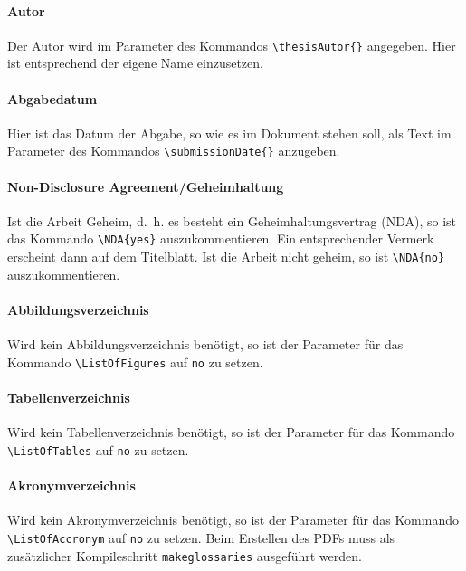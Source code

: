 \paragraph{Autor} Der Autor wird im Parameter des Kommandos \texttt{\textbackslash thesisAutor\{\}} angegeben. Hier ist entsprechend der eigene Name einzusetzen.

\paragraph{Abgabedatum} Hier ist das Datum der Abgabe, so wie es im Dokument stehen soll, als Text im Parameter des Kommandos \texttt{\textbackslash submissionDate\{\}} anzugeben.

\paragraph{Non-Disclosure Agreement/Geheimhaltung} Ist die Arbeit Geheim, d.~h. es besteht ein Geheimhaltungsvertrag (NDA), so ist das Kommando \texttt{\textbackslash NDA\{yes\}} auszukommentieren. Ein entsprechender Vermerk erscheint dann auf dem Titelblatt. Ist die Arbeit nicht geheim, so ist \texttt{\textbackslash NDA\{no\}} auszukommentieren.

\paragraph{Abbildungsverzeichnis} Wird kein Abbildungsverzeichnis benötigt, so ist der Parameter für das Kommando \texttt{\textbackslash ListOfFigures} auf \texttt{no} zu setzen.

\paragraph{Tabellenverzeichnis} Wird kein Tabellenverzeichnis benötigt, so ist der Parameter für das Kommando \texttt{\textbackslash ListOfTables} auf \texttt{no} zu setzen.

\paragraph{Akronymverzeichnis} Wird kein Akronymverzeichnis benötigt, so ist der Parameter für das Kommando \texttt{\textbackslash ListOfAccronym} auf \texttt{no} zu setzen. Beim Erstellen des PDFs muss als zusätzlicher Kompileschritt \texttt{makeglossaries} ausgeführt werden.

